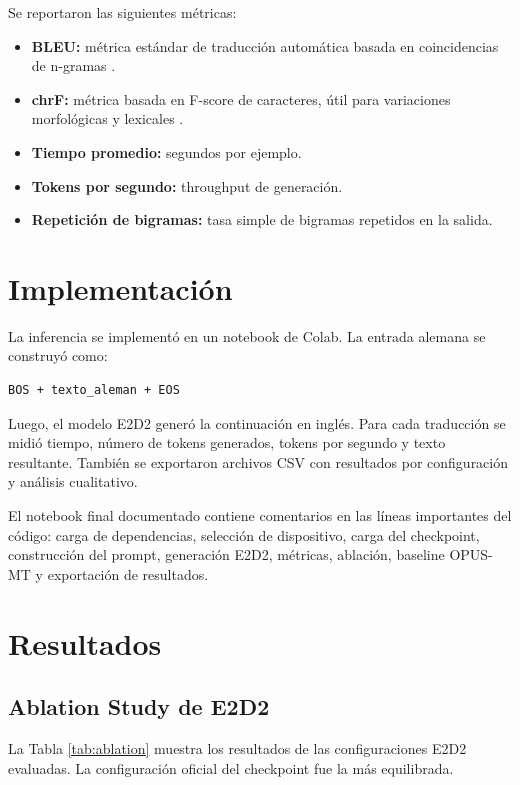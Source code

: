 \documentclass[conference]{IEEEtran}
\begin{document}
Se reportaron las siguientes métricas:

\begin{itemize}
    \item \textbf{BLEU:} métrica estándar de traducción automática basada en coincidencias de n-gramas \cite{post2018call}.
    \item \textbf{chrF:} métrica basada en F-score de caracteres, útil para variaciones morfológicas y lexicales \cite{popovic2015chrf}.
    \item \textbf{Tiempo promedio:} segundos por ejemplo.
    \item \textbf{Tokens por segundo:} throughput de generación.
    \item \textbf{Repetición de bigramas:} tasa simple de bigramas repetidos en la salida.
\end{itemize}

\section{Implementación}

La inferencia se implementó en un notebook de Colab. La entrada alemana se construyó como:

\begin{verbatim}
BOS + texto_aleman + EOS
\end{verbatim}

Luego, el modelo E2D2 generó la continuación en inglés. Para cada traducción se midió tiempo, número de tokens generados, tokens por segundo y texto resultante. También se exportaron archivos CSV con resultados por configuración y análisis cualitativo.

El notebook final documentado contiene comentarios en las líneas importantes del código: carga de dependencias, selección de dispositivo, carga del checkpoint, construcción del prompt, generación E2D2, métricas, ablación, baseline OPUS-MT y exportación de resultados.

\section{Resultados}

\subsection{Ablation Study de E2D2}

La Tabla \ref{tab:ablation} muestra los resultados de las configuraciones E2D2 evaluadas. La configuración oficial del checkpoint fue la más equilibrada.
\end{document}
